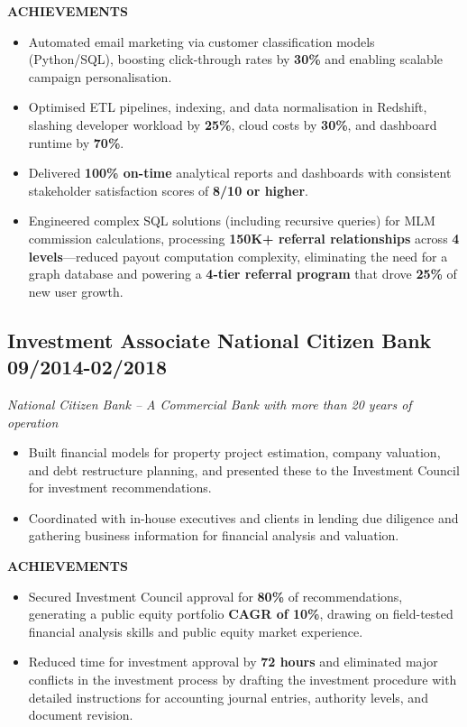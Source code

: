 \documentclass[11pt,a4paper]{article}
\begin{document}
\begin{mdframed}[style=dashedleft]
\textbf{ACHIEVEMENTS}
\begin{itemize}[leftmargin=1.5em, itemsep=4pt]
    \item Automated email marketing via customer classification models (Python/SQL), boosting click-through rates by \textbf{30\%} and enabling scalable campaign personalisation.
    \item Optimised ETL pipelines, indexing, and data normalisation in Redshift, slashing developer workload by \textbf{25\%}, cloud costs by \textbf{30\%}, and dashboard runtime by \textbf{70\%}.
    \item Delivered \textbf{100\% on-time} analytical reports and dashboards with consistent stakeholder satisfaction scores of \textbf{8/10 or higher}.
    \item Engineered complex SQL solutions (including recursive queries) for MLM commission calculations, processing \textbf{150K+ referral relationships} across \textbf{4 levels}—reduced payout computation complexity, eliminating the need for a graph database and powering a \textbf{4-tier referral program} that drove \textbf{25\%} of new user growth.
\end{itemize}

\vspace{4pt}

\subsection*{Investment Associate \hfill \textbf{National Citizen Bank} \hfill 09/2014-02/2018}
\textit{National Citizen Bank -- A Commercial Bank with more than 20 years of operation}

\begin{itemize}[leftmargin=1.5em, itemsep=4pt]
    \item Built financial models for property project estimation, company valuation, and debt restructure planning, and presented these to the Investment Council for investment recommendations.
    \item Coordinated with in-house executives and clients in lending due diligence and gathering business information for financial analysis and valuation.
\end{itemize}

\textbf{ACHIEVEMENTS}
\begin{itemize}[leftmargin=1.5em, itemsep=4pt]
    \item Secured Investment Council approval for \textbf{80\%} of recommendations, generating a public equity portfolio \textbf{CAGR of 10\%}, drawing on field-tested financial analysis skills and public equity market experience.
    \item Reduced time for investment approval by \textbf{72 hours} and eliminated major conflicts in the investment process by drafting the investment procedure with detailed instructions for accounting journal entries, authority levels, and document revision.
\end{itemize}

\end{mdframed}
\end{document}
